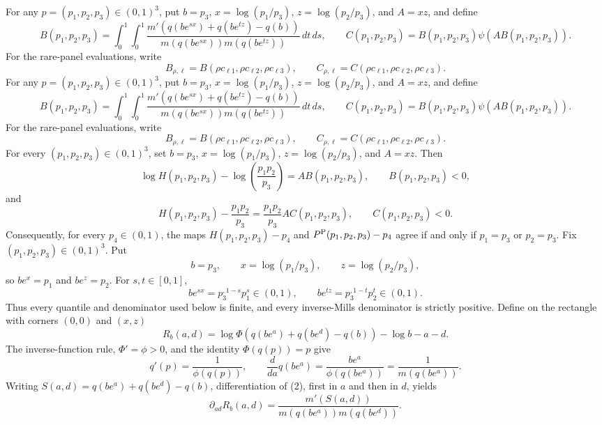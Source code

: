 For any \(p=(p_1,p_2,p_3)\in(0,1)^3\), put \(b=p_3\), \(x=\log(p_1/p_3)\), \(z=\log(p_2/p_3)\), and \(A=xz\), and define
\[
B(p_1,p_2,p_3)=\int_0^1\!\int_0^1
\frac{m'\!\left(q(be^{sx})+q(be^{tz})-q(b)\right)}
{m\!\left(q(be^{sx})\right)m\!\left(q(be^{tz})\right)}\,dt\,ds,
\qquad
C(p_1,p_2,p_3)=B(p_1,p_2,p_3)\psi\!\left(A B(p_1,p_2,p_3)\right).
\]
For the rare-panel evaluations, write
\[
B_{\rho,\ell}=B(\rho c_{\ell1},\rho c_{\ell2},\rho c_{\ell3}),
\qquad
C_{\rho,\ell}=C(\rho c_{\ell1},\rho c_{\ell2},\rho c_{\ell3}).
\]
For any \(p=(p_1,p_2,p_3)\in(0,1)^3\), put \(b=p_3\), \(x=\log(p_1/p_3)\), \(z=\log(p_2/p_3)\), and \(A=xz\), and define
\[
B(p_1,p_2,p_3)=\int_0^1\!\int_0^1
\frac{m'\!\left(q(be^{sx})+q(be^{tz})-q(b)\right)}
{m\!\left(q(be^{sx})\right)m\!\left(q(be^{tz})\right)}\,dt\,ds,
\qquad
C(p_1,p_2,p_3)=B(p_1,p_2,p_3)\psi\!\left(A B(p_1,p_2,p_3)\right).
\]
For the rare-panel evaluations, write
\[
B_{\rho,\ell}=B(\rho c_{\ell1},\rho c_{\ell2},\rho c_{\ell3}),
\qquad
C_{\rho,\ell}=C(\rho c_{\ell1},\rho c_{\ell2},\rho c_{\ell3}).
\]
For every \((p_1,p_2,p_3)\in(0,1)^3\), set \(b=p_3\), \(x=\log(p_1/p_3)\), \(z=\log(p_2/p_3)\), and \(A=xz\). Then
\[
\log H(p_1,p_2,p_3)-\log\!\left(\frac{p_1p_2}{p_3}\right)
=A B(p_1,p_2,p_3),
\qquad B(p_1,p_2,p_3)<0,
\]
and
\[
H(p_1,p_2,p_3)-\frac{p_1p_2}{p_3}
=\frac{p_1p_2}{p_3}A C(p_1,p_2,p_3),
\qquad C(p_1,p_2,p_3)<0.
\]
Consequently, for every \(p_4\in(0,1)\), the maps \(H(p_1,p_2,p_3)-p_4\) and \(P^{\rm P}(p_1,p_2,p_3)-p_4\) agree if and only if \(p_1=p_3\) or \(p_2=p_3\).
Fix \((p_1,p_2,p_3)\in(0,1)^3\).  Put
\[
b=p_3,
\qquad x=\log(p_1/p_3),
\qquad z=\log(p_2/p_3),
\]
so \(be^x=p_1\) and \(be^z=p_2\).  For \(s,t\in[0,1]\),
\[
be^{sx}=p_3^{,1-s}p_1^s\in(0,1),
\qquad
be^{tz}=p_3^{,1-t}p_2^t\in(0,1).
\tag{1}
\]
Thus every quantile and denominator used below is finite, and every inverse-Mills denominator is strictly positive.  Define on the rectangle with corners \((0,0)\) and \((x,z)\)
\[
R_b(a,d)=
\log\Phi\!\left(q(be^a)+q(be^d)-q(b)\right)-\log b-a-d.
\tag{2}
\]
The inverse-function rule, \(\Phi'=\phi>0\), and the identity \(\Phi(q(p))=p\) give
\[
q'(p)=\frac{1}{\phi(q(p))},
\qquad
\frac{d}{da}q(be^a)
=\frac{be^a}{\phi(q(be^a))}
=\frac{1}{m(q(be^a))}.
\tag{3}
\]
Writing \(S(a,d)=q(be^a)+q(be^d)-q(b)\), differentiation of (2), first in \(a\) and then in \(d\), yields
\[
\partial_{ad}R_b(a,d)
=\frac{m'(S(a,d))}
{m(q(be^a))m(q(be^d))}.
\tag{4}
\]
